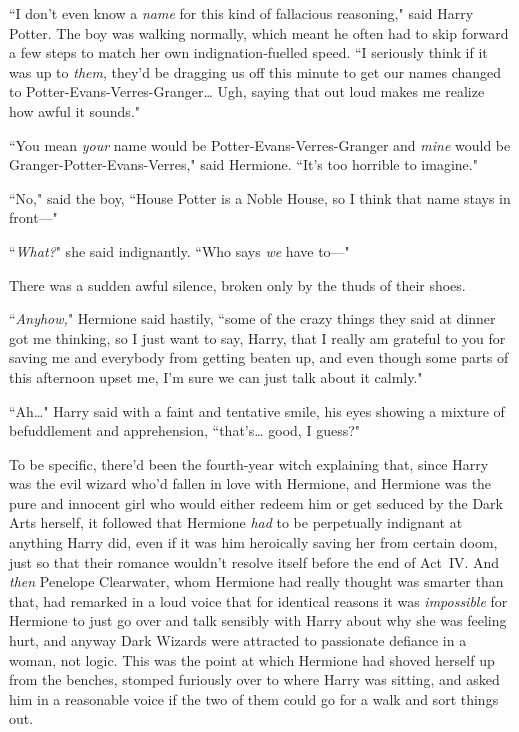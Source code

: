 ``I don't even know a \emph{name} for this kind of fallacious reasoning," said Harry Potter. The boy was walking normally, which meant he often had to skip forward a few steps to match her own indignation-fuelled speed. ``I seriously think if it was up to \emph{them}, they'd be dragging us off this minute to get our names changed to Potter-Evans-Verres-Granger{\ldots} Ugh, saying that out loud makes me realize how awful it sounds."

``You mean \emph{your} name would be Potter-Evans-Verres-Granger and \emph{mine} would be Granger-Potter-Evans-Verres," said Hermione. ``It's too horrible to imagine."

``No," said the boy, ``House Potter is a Noble House, so I think that name stays in front—"

``\emph{What?}" she said indignantly. ``Who says \emph{we} have to—"

There was a sudden awful silence, broken only by the thuds of their shoes.

``\emph{Anyhow,}" Hermione said hastily, ``some of the crazy things they said at dinner got me thinking, so I just want to say, Harry, that I really am grateful to you for saving me and everybody from getting beaten up, and even though some parts of this afternoon upset me, I'm sure we can just talk about it calmly."

``Ah{\ldots}" Harry said with a faint and tentative smile, his eyes showing a mixture of befuddlement and apprehension, ``that's{\ldots} good, I guess?"

To be specific, there'd been the fourth-year witch explaining that, since Harry was the evil wizard who'd fallen in love with Hermione, and Hermione was the pure and innocent girl who would either redeem him or get seduced by the Dark Arts herself, it followed that Hermione \emph{had} to be perpetually indignant at anything Harry did, even if it was him heroically saving her from certain doom, just so that their romance wouldn't resolve itself before the end of Act~IV. And \emph{then} Penelope Clearwater, whom Hermione had really thought was smarter than that, had remarked in a loud voice that for identical reasons it was \emph{impossible} for Hermione to just go over and talk sensibly with Harry about why she was feeling hurt, and anyway Dark Wizards were attracted to passionate defiance in a woman, not logic. This was the point at which Hermione had shoved herself up from the benches, stomped furiously over to where Harry was sitting, and asked him in a reasonable voice if the two of them could go for a walk and sort things out.

